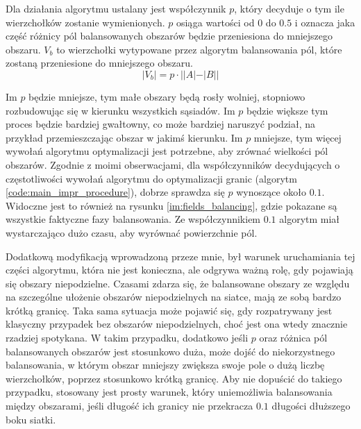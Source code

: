 \newpage
Dla działania algorytmu ustalany jest współczynnik $p$, który decyduje o tym ile wierzchołków zostanie wymienionych.
$p$ osiąga wartości od $0$ do $0.5$ i oznacza jaka część różnicy pól balansowanych obszarów będzie przeniesiona do mniejszego obszaru.
$V_b$ to wierzchołki wytypowane przez algorytm balansowania pól, które zostaną przeniesione do mniejszego
obszaru.
\begin{equation}
|V_b| = p \cdot ||A| - |B||
\end{equation}

Im $p$ będzie mniejsze, tym małe obszary będą rosły wolniej, stopniowo rozbudowując się w kierunku wszystkich sąsiadów.
Im $p$ będzie większe tym proces będzie bardziej gwałtowny, co może bardziej naruszyć podział, na przykład przemieszczając
obszar w jakimś kierunku.
Im $p$ mniejsze, tym więcej wywołań algorytmu optymalizacji jest potrzebne, aby zrównać wielkości pól obszarów.
Zgodnie z moimi obserwacjami, dla współczynników decydujących o częstotliwości
wywołań algorytmu do optymalizacji granic (algorytm \ref{code:main_impr_procedure}), dobrze sprawdza się $p$ wynoszące
około $0.1$. Widoczne jest to również na rysunku \ref{im:fields_balancing}, gdzie pokazane są wszystkie faktyczne fazy balansowania.
Ze współczynnikiem $0.1$ algorytm miał wystarczająco dużo czasu, aby wyrównać powierzchnie pól.

Dodatkową modyfikacją wprowadzoną przeze mnie, był warunek uruchamiania tej części algorytmu, która nie jest konieczna,
ale odgrywa ważną rolę, gdy pojawiają się obszary niepodzielne.
Czasami zdarza się, że balansowane obszary ze względu na szczególne ułożenie obszarów niepodzielnych na siatce,
mają ze sobą bardzo krótką granicę.
Taka sama sytuacja może pojawić się, gdy rozpatrywany jest klasyczny przypadek bez obszarów
niepodzielnych, choć jest ona wtedy znacznie rzadziej spotykana.
W takim przypadku, dodatkowo jeśli $p$ oraz różnica pól balansowanych obszarów jest stosunkowo duża, może dojść
do niekorzystnego balansowania, w którym obszar mniejszy zwiększa swoje pole o dużą liczbę wierzchołków, poprzez
stosunkowo krótką granicę.
Aby nie dopuścić do takiego przypadku, stosowany jest prosty warunek, który uniemożliwia balansowania
między obszarami, jeśli długość ich granicy nie przekracza $0.1$ długości dłuższego boku siatki.
